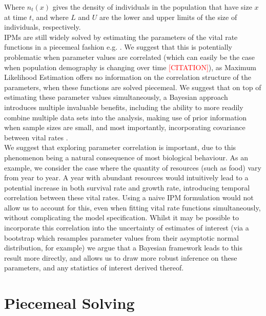 \documentclass[a4paper,12pt]{article}
\begin{document}
Where $n_{t}(x)$ gives the density of individuals in the population that have size $x$ at time $t$, and where $L$ and $U$ are the lower and upper limits of the size of individuals, respectively. \\


IPMs are still widely solved by estimating the parameters of the vital rate functions in a piecemeal fashion e.g. \citet{Snakes, ThreatenedHerb, Struck, NichePlants, Quintana}. We suggest that this is potentially problematic when parameter values are correlated (which can easily be the case when population demography is changing over time \textcolor{red}{[CITATION]}), as Maximum Likelihood Estimation offers no information on the correlation structure of the parameters, when these functions are solved piecemeal. We suggest that on top of estimating these parameter values simultaneously, a Bayesian approach introduces multiple invaluable benefits, including the ability to more readily combine multiple data sets into the analysis, making use of prior information when sample sizes are small, and most importantly, incorporating covariance between vital rates \citep{BayesIPM}.\\

We suggest that exploring parameter correlation is important, due to this phenomenon being a natural consequence of most biological behaviour. As an example, we consider the case where the quantity of resources (such as food) vary from year to year. A year with abundant resources would intuitively lead to a potential increase in both survival rate and growth rate, introducing temporal correlation between these vital rates. Using a naive IPM formulation would not allow us to account for this, even when fitting vital rate functions simultaneously, without complicating the model specification. Whilst it may be possible to incorporate this correlation into the uncertainty of estimates of interest (via a bootstrap which resamples parameter values from their asymptotic normal distribution, for example) we argue that a Bayesian framework leads to this result more directly, and allows us to draw more robust inference on these parameters, and any statistics of interest derived thereof.

\newpage
\section{Piecemeal Solving}
\end{document}
